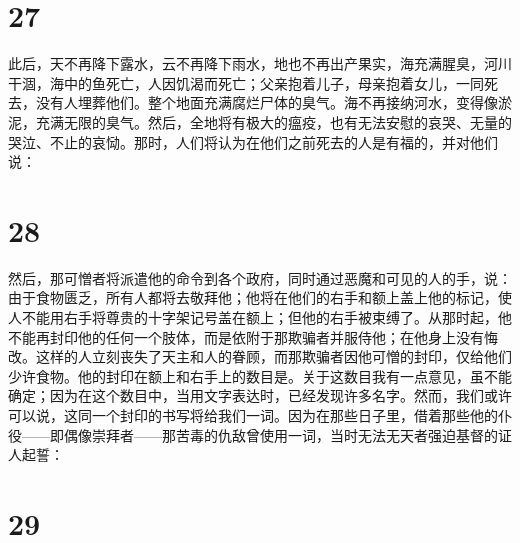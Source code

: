 
\section{27}

此后，天不再降下露水，云不再降下雨水，地也不再出产果实，海充满腥臭，河川干涸，海中的鱼死亡，人因饥渴而死亡；父亲抱着儿子，母亲抱着女儿，一同死去，没有人埋葬他们。整个地面充满腐烂尸体的臭气。海不再接纳河水，变得像淤泥，充满无限的臭气。然后，全地将有极大的瘟疫，也有无法安慰的哀哭、无量的哭泣、不止的哀恸。那时，人们将认为在他们之前死去的人是有福的，并对他们说：\par


\section{28}

然后，那可憎者将派遣他的命令到各个政府，同时通过恶魔和可见的人的手，说：由于食物匮乏，所有人都将去敬拜他；他将在他们的右手和额上盖上他的标记，使人不能用右手将尊贵的十字架记号盖在额上；但他的右手被束缚了。从那时起，他不能再封印他的任何一个肢体，而是依附于那欺骗者并服侍他；在他身上没有悔改。这样的人立刻丧失了天主和人的眷顾，而那欺骗者因他可憎的封印，仅给他们少许食物。他的封印在额上和右手上的数目是。关于这数目我有一点意见，虽不能确定；因为在这个数目中，当用文字表达时，已经发现许多名字。然而，我们或许可以说，这同一个封印的书写将给我们一词。因为在那些日子里，借着那些他的仆役——即偶像崇拜者——那苦毒的仇敌曾使用一词，当时无法无天者强迫基督的证人起誓：\par


\section{29}

